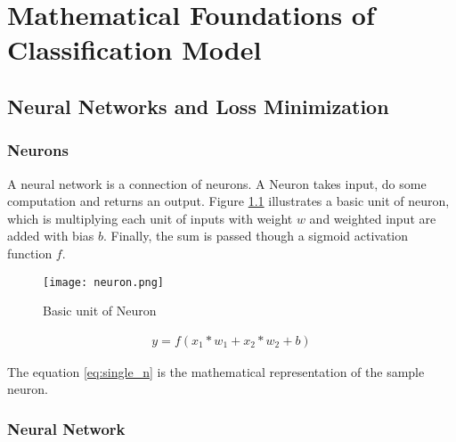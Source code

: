 \chapter{Mathematical Foundations of Classification Model} \label{ch:math-behid}

\section{Neural Networks and Loss Minimization}

\subsection*{Neurons}

A neural network is a connection of neurons. A Neuron takes input, do some computation and returns an output.  Figure \ref{fig:basic neuron} illustrates a basic unit of neuron, which is multiplying each unit of inputs with weight $w$ and weighted input are added with bias $b$. Finally, the sum is passed though a sigmoid activation function $ f $.  
\begin{figure}[H]
    \centering    
    \texttt{[image: neuron.png]}
    \caption{Basic unit of Neuron \parencite{VictorZhou}}
    \label{fig:basic neuron}
\end{figure}


\begin{align}
    y = f(x_1 * w_1 + x_2 * w_2 + b) \label{eq:single_n}
\end{align}

The equation \ref{eq:single_n} is the mathematical representation of the sample neuron.

\subsection*{Neural Network}





